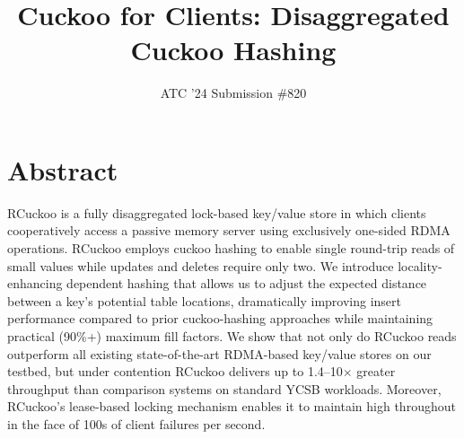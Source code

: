 \documentclass[10pt,twocolumn]{article}
\begin{document}
\title{Cuckoo for Clients: Disaggregated Cuckoo Hashing}
\author{ATC '24 Submission \#820}
\date{}

\maketitle

\section*{Abstract}


RCuckoo is a fully disaggregated lock-based key/value store in which
clients cooperatively access a passive memory server using exclusively
one-sided RDMA operations.  RCuckoo employs cuckoo hashing to enable
single round-trip reads of small values while updates and deletes
require only two.  We introduce locality-enhancing dependent hashing
that allows us to adjust the expected distance between a key's
potential table locations, dramatically improving insert performance
compared to prior cuckoo-hashing approaches while maintaining
practical (90\%+) maximum fill factors.  We show that not only do
RCuckoo reads outperform all existing state-of-the-art RDMA-based
key/value stores on our testbed, but under contention RCuckoo delivers up to
1.4--10$\times$ greater throughput than comparison systems on standard
YCSB workloads.  Moreover, RCuckoo's lease-based locking mechanism
enables it to maintain high throughout in the face of 100s of
client failures per second.

\end{document}
